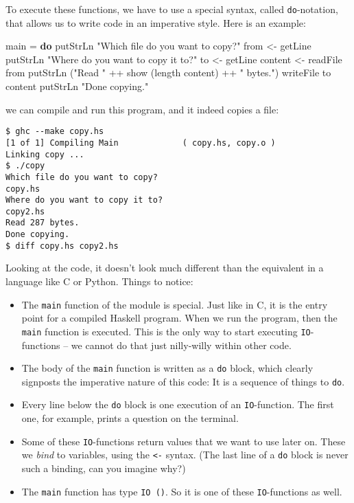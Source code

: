 \documentclass[11pt,
  american,
  DIV13]{article}
\newenvironment{Shaded}{}{}
\newcommand{\FunctionTok}[1]{\textcolor[rgb]{0.02,0.16,0.49}{#1}}
\newcommand{\KeywordTok}[1]{\textcolor[rgb]{0.00,0.44,0.13}{\textbf{#1}}}
\newcommand{\NormalTok}[1]{#1}
\newcommand{\OperatorTok}[1]{\textcolor[rgb]{0.40,0.40,0.40}{#1}}
\newcommand{\OtherTok}[1]{\textcolor[rgb]{0.00,0.44,0.13}{#1}}
\newcommand{\StringTok}[1]{\textcolor[rgb]{0.25,0.44,0.63}{#1}}
\providecommand{\tightlist}{%
  \setlength{\itemsep}{0pt}\setlength{\parskip}{0pt}}
\begin{document}
To execute these functions, we have to use a special syntax, called
\texttt{do}-notation, that allows us to write code in an imperative
style. Here is an example:

\begin{Shaded}
\begin{Highlighting}[]
\NormalTok{main }\OtherTok{=} \KeywordTok{do}
    \FunctionTok{putStrLn} \StringTok{"Which file do you want to copy?"}
\NormalTok{    from }\OtherTok{\textless{}{-}} \FunctionTok{getLine}
    \FunctionTok{putStrLn} \StringTok{"Where do you want to copy it to?"}
\NormalTok{    to }\OtherTok{\textless{}{-}} \FunctionTok{getLine}
\NormalTok{    content }\OtherTok{\textless{}{-}} \FunctionTok{readFile}\NormalTok{ from}
    \FunctionTok{putStrLn}\NormalTok{ (}\StringTok{"Read "} \OperatorTok{++} \FunctionTok{show}\NormalTok{ (}\FunctionTok{length}\NormalTok{ content) }\OperatorTok{++} \StringTok{" bytes."}\NormalTok{)}
    \FunctionTok{writeFile}\NormalTok{ to content}
    \FunctionTok{putStrLn} \StringTok{"Done copying."}
\end{Highlighting}
\end{Shaded}

we can compile and run this program, and it indeed copies a file:

\begin{verbatim}
$ ghc --make copy.hs
[1 of 1] Compiling Main             ( copy.hs, copy.o )
Linking copy ...
$ ./copy
Which file do you want to copy?
copy.hs
Where do you want to copy it to?
copy2.hs
Read 287 bytes.
Done copying.
$ diff copy.hs copy2.hs
\end{verbatim}

Looking at the code, it doesn't look much different than the equivalent
in a language like C or Python. Things to notice:

\begin{itemize}
\tightlist
\item
  The \texttt{main} function of the module is special. Just like in C,
  it is the entry point for a compiled Haskell program. When we run the
  program, then the \texttt{main} function is executed. This is the only
  way to start executing \texttt{IO}-functions -- we cannot do that just
  nilly-willy within other code.
\item
  The body of the \texttt{main} function is written as a \texttt{do}
  block, which clearly signposts the imperative nature of this code: It
  is a sequence of things to \texttt{do}.
\item
  Every line below the \texttt{do} block is one execution of an
  \texttt{IO}-function. The first one, for example, prints a question on
  the terminal.
\item
  Some of these \texttt{IO}-functions return values that we want to use
  later on. These we \emph{bind} to variables, using the
  \texttt{\textless{}-} syntax. (The last line of a \texttt{do} block is
  never such a binding, can you imagine why?)
\item
  The \texttt{main} function has type \texttt{IO\ ()}. So it is one of
  these \texttt{IO}-functions as well.
\end{itemize}
\end{document}
